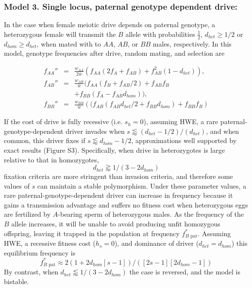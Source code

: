 \documentclass{pnastwo}
\begin{document}
\begin{article}
\subsubsection{Model 3. Single locus, paternal genotype dependent drive:}
In the case when female meiotic drive depends on paternal genotype,
 a heterozygous female will transmit the $B$ allele 
  with probabilities  $\frac{1}{2}$,  $d_{het}\geq 1/2 $ or $d_{hom}\geq d_{het}$, 
 when mated with to $AA$, $AB$, or $BB$ males,  respectively. 
  In this model, genotype frequencies after drive, random mating, and selection are 
  
\begin{eqnarray*}
f_{AA}''&=&\frac{w_{AA}}{2\bar{w}}\left( f_{AA} (2 f_A + f_{AB} ) + f_{AB}^2 (1 - d_{het}) \right),\\
f_{AB}''&=&\frac{w_{AB}}{\bar{w}}\big(f_{AA} (f_B + f_{AB}/2) +  f_{AB} f_B \\&& + f_{BB}(f_A - f_{AB} d_{hom})\big),\\
f_{BB}''&=&\frac{w_{BB}}{\bar{w}}\left((f_{AB} (f_{AB} d_{het}/2 + f_{BB} d_{hom}) + f_{BB} f_B\right)
\end{eqnarray*}



If the cost of drive is fully recessive (i.e. $s_h=0$), assuming HWE, 
	a rare paternal-genotype-dependent driver invades when 
	$s\lessapprox (d_{het}-1/2)/(d_{het})$, and when common, this driver fixes if 
	$s\lessapprox d_{hom}-1/2$, approximations well supported by exact results (Figure S3).
Specifically, when drive in heterozygotes is large relative to that in homozygotes, 
	\begin{equation} d_{het}  \gtrapprox 1/(3-2d_{hom}) \label{polymale} \end{equation}
	fixation criteria are more stringent than invasion criteria, 
	and therefore some values of $s$ can maintain a stable polymorphism. 
Under these parameter values, a rare paternal-genotype-dependent driver 
	can increase in frequency because it gains a transmission advantage and suffers 
	no fitness cost when heterozygous eggs are fertilized by 
	$A$-bearing sperm of heterozygous males. 
As the frequency of the $B$ allele increases, 
	it will be unable to 
	avoid producing unfit homozygous offspring, leaving it trapped in
	the population at frequency $f_{B\text{ pat}}^*$. 
Assuming HWE, a recessive fitness cost ($h_s=0$), and dominance of driver ($d_{het}=d_{hom}$) this equilibrium frequency is
\begin{equation}f_{B\text{ pat}}^*\approx2 (1 + 2d_{hom}[s - 1])/([2 s - 1][2d_{hom}- 1]) \label{eqmale} \end{equation}
By contrast, when $d_{het} \lessapprox 1/(3-2d_{hom})$ the case is reversed, and the model is bistable.
 

\end{article}
\end{document}
